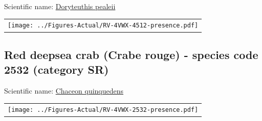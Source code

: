 \documentclass[12pt]{article}\usepackage[]{graphicx}\usepackage[]{color}
\begin{document}

Scientific name: \href{http://www.marinespecies.org/aphia.php?p=taxdetails\&id=574541}{Doryteuthis pealeii} \newline
\begin{minipage}{1.0\textwidth}
 \begin{tabular}{c}
\texttt{[image: ../Figures-Actual/RV-4VWX-4512-presence.pdf]} \\ 
\end{tabular} 
\end{minipage}
\clearpage

\renewcommand\thefigure{\thesubsection\Alph{figure}}

\setcounter{figure}{0}

\hypertarget{sec:2532}{%
\subsection{Red deepsea crab (Crabe rouge) - species code 2532 (category SR)}\label{sec:2532}}

  


Scientific name: \href{http://www.marinespecies.org/aphia.php?p=taxdetails\&id=158407}{Chaceon quinquedens} \newline
\begin{minipage}{1.0\textwidth}
 \begin{tabular}{c}
\texttt{[image: ../Figures-Actual/RV-4VWX-2532-presence.pdf]} \\ 
\end{tabular} 
\end{minipage}
\clearpage

\printindex
\end{document}
